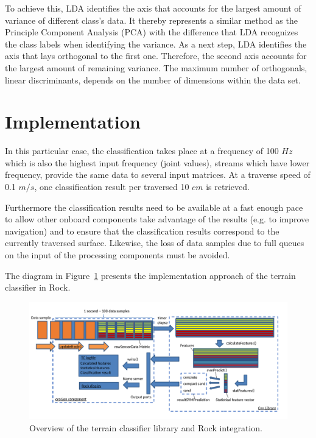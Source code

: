 \documentclass{article}
\begin{document}
To achieve this, LDA identifies the axis that accounts for the largest amount of variance of different class's data. It thereby represents a similar method as the Principle Component Analysis (PCA) with the difference that LDA recognizes the class labels when identifying the variance. As a next step, LDA identifies the axis that lays orthogonal to the first one. Therefore, the second axis accounts for the largest amount of remaining variance. The maximum number of orthogonals, linear discriminants, depends on the number of dimensions within the data set.\cite{kuhr2021}



\section{Implementation}

In this particular case, the classification takes place at a frequency of 100 $Hz$ which is also the highest input frequency (joint values), streams which have lower frequency, provide the same data to several input matrices. At a traverse speed of 0.1 $m/s$, one classification result per traversed 10 $cm$ is retrieved. 

Furthermore the classification results need to be available at a fast enough pace to allow other onboard components take advantage of the results (e.g. to improve navigation) and to ensure that the classification results correspond to the currently traversed surface. 
Likewise, the loss of data samples due to full queues on the input of the processing components must be avoided. 

The diagram in Figure~\ref{fig:overview} presents the implementation approach of the terrain classifier in Rock.

\begin{figure}[h]
\centering
\includegraphics[width=\textwidth]{../figures/OverviewTC2.pdf}
\caption{\label{fig:overview}Overview of the terrain classifier library and Rock integration.}
\end{figure}
\end{document}
